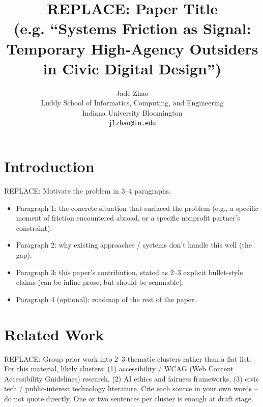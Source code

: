 \documentclass[10pt,twocolumn]{article}
\title{\vspace{-0.5em}\LARGE\bfseries REPLACE: Paper Title\\
\large (e.g. ``Systems Friction as Signal: Temporary High-Agency
Outsiders in Civic Digital Design'')}
\author{
Jade Zhao\\
\small Luddy School of Informatics, Computing, and Engineering\\
\small Indiana University Bloomington\\
\small \texttt{jlzhao@iu.edu}
}
\date{}
\begin{document}

\section{Introduction}
REPLACE: Motivate the problem in 3--4 paragraphs.
\begin{itemize}[leftmargin=*]
  \item Paragraph 1: the concrete situation that surfaced the problem
        (e.g., a specific moment of friction encountered abroad, or a
        specific nonprofit partner's constraint).
  \item Paragraph 2: why existing approaches / systems don't handle this
        well (the gap).
  \item Paragraph 3: this paper's contribution, stated as 2--3 explicit
        bullet-style claims (can be inline prose, but should be
        scannable).
  \item Paragraph 4 (optional): roadmap of the rest of the paper.
\end{itemize}

\section{Related Work}
REPLACE: Group prior work into 2--3 thematic clusters rather than a flat
list. For this material, likely clusters: (1) accessibility / WCAG
(Web Content Accessibility Guidelines) research, (2) AI ethics and
fairness frameworks, (3) civic tech / public-interest technology
literature. Cite each source in your own words -- do not quote
directly. One or two sentences per cluster is enough at draft stage.
\end{document}
